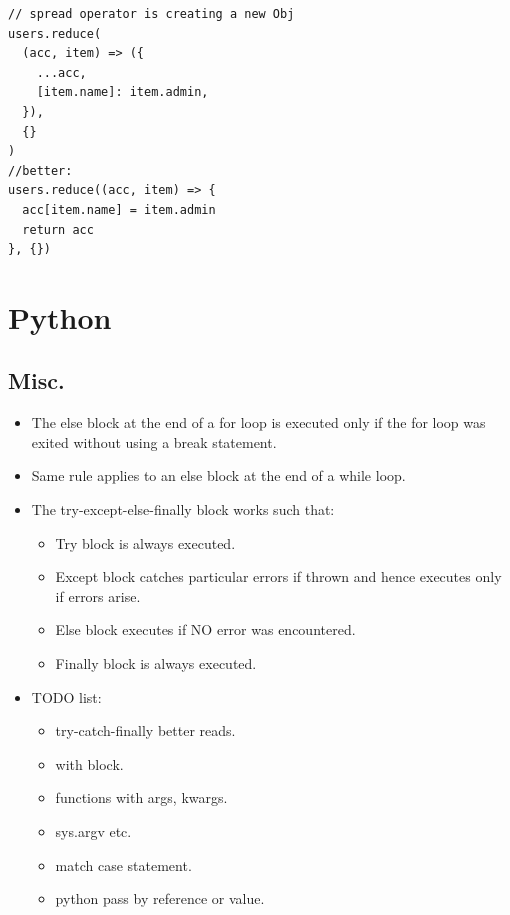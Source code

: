 \documentclass{report}
\begin{document}
\begin{itemize}
\begin{lstlisting}
// spread operator is creating a new Obj
users.reduce(
  (acc, item) => ({
    ...acc,
    [item.name]: item.admin,
  }),
  {}
)
//better: 
users.reduce((acc, item) => {
  acc[item.name] = item.admin
  return acc
}, {})

\end{lstlisting}
\end{itemize}
\chapter{Python}
\section{Misc.}
\begin{itemize}
\item The else block at the end of a for loop is executed only if the for loop was exited without using a break statement.
\item Same rule applies to an else block at the end of a while loop.
\item The try-except-else-finally block works such that:
\begin{itemize}
\item Try block is always executed.
\item Except block catches particular errors if thrown and hence executes only if errors arise.
\item Else block executes if NO error was encountered.
\item Finally block is always executed.
\end{itemize}
\item TODO list:
\begin{itemize}
\item try-catch-finally better reads.
\item with block.
\item functions with args, kwargs.
\item sys.argv etc.
\item match case statement.
\item python pass by reference or value.
\end{itemize}
\end{itemize}
\end{document}

